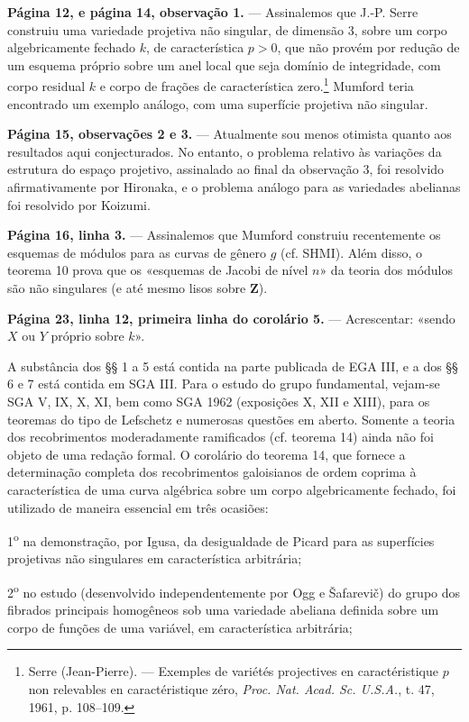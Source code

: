 \documentclass[11pt,twoside,openany]{book}
\numberwithin{equation}{section}
\newcommand{\src}[1]{%
  \phantomsection\hypertarget{src:#1}{}%
  \marginpar{\raggedleft\footnotesize\sffamily #1}%
}
\theoremstyle{plain}
\theoremstyle{definition}
\theoremstyle{remark}
\newcommand{\FgaUnitKey}{frontmatter}
\renewcommand{\src}[1]{%
  \phantomsection\hypertarget{src:\FgaUnitKey:#1}{}%
  \marginpar{\raggedleft\footnotesize\sffamily #1}%
}
\begin{document}
\src{299}
\noindent\textbf{Página 12, e página 14, observação 1.} --- Assinalemos que J.-P.
Serre construiu uma variedade projetiva não singular, de dimensão 3, sobre
um corpo algebricamente fechado $k$, de característica $p>0$, que não provém
por redução de um esquema próprio sobre um anel local que seja domínio de
integridade, com corpo residual $k$ e corpo de frações de característica
zero.\footnote{Serre (Jean-Pierre). --- Exemples de variétés projectives en
caractéristique $p$ non relevables en caractéristique zéro, \emph{Proc. Nat.
Acad. Sc. U.S.A.}, t. 47, 1961, p. 108--109.} Mumford teria encontrado um exemplo
análogo, com uma superfície projetiva não singular.

\noindent\textbf{Página 15, observações 2 e 3.} --- Atualmente sou menos
otimista quanto aos resultados aqui conjecturados. No entanto, o
problema relativo às variações da estrutura do espaço projetivo,
assinalado ao final da observação 3, foi resolvido afirmativamente por
Hironaka, e o problema análogo para as variedades abelianas foi resolvido
por Koizumi.

\noindent\textbf{Página 16, linha 3.} --- Assinalemos que Mumford construiu
recentemente os esquemas de módulos para as curvas de gênero $g$ (cf. SHMI).
Além disso, o teorema 10 prova que os «esquemas de Jacobi de nível $n$»
da teoria dos módulos são não singulares (e até mesmo lisos sobre $\mathbf Z$).

\noindent\textbf{Página 23, linha 12, primeira linha do corolário
5.} --- Acrescentar: «sendo $X$ ou $Y$ próprio sobre $k$».

A substância dos §§ 1 a 5 está contida na parte publicada de EGA III, e
a dos §§ 6 e 7 está contida em SGA III. Para o estudo do grupo
fundamental, vejam-se SGA V, IX, X, XI, bem como SGA 1962 (exposições X, XII e
XIII), para os teoremas do tipo de Lefschetz e numerosas questões em aberto.
Somente a teoria dos recobrimentos moderadamente ramificados (cf. teorema 14)
ainda não foi objeto de uma redação formal. O corolário do teorema 14,
que fornece a determinação completa dos recobrimentos galoisianos de ordem
coprima à característica de uma curva algébrica sobre um corpo
algebricamente fechado, foi utilizado de maneira essencial em três ocasiões:

1\textsuperscript{o} na demonstração, por Igusa, da desigualdade de Picard
para as superfícies projetivas não singulares em característica arbitrária;

2\textsuperscript{o} no estudo (desenvolvido independentemente por Ogg e
Šafarevič) do grupo dos fibrados principais homogêneos sob uma variedade
abeliana definida sobre um corpo de funções de uma variável, em
característica arbitrária;
\end{document}
